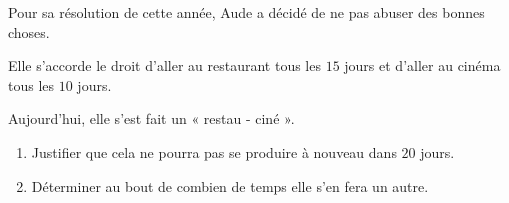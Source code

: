 \begin{exercice*}
    Pour sa résolution de cette année, Aude a décidé de ne pas abuser des bonnes choses.

    Elle s'accorde le droit d'aller au restaurant tous les $15$ jours et d'aller au cinéma tous les $10$ jours.

    Aujourd'hui, elle s'est fait un « restau - ciné ».

    \begin{enumerate}
        \item Justifier que cela ne pourra pas se produire à nouveau dans $20$ jours.
        \item Déterminer au bout de combien de temps elle s'en fera un autre.
    \end{enumerate}
\end{exercice*}
